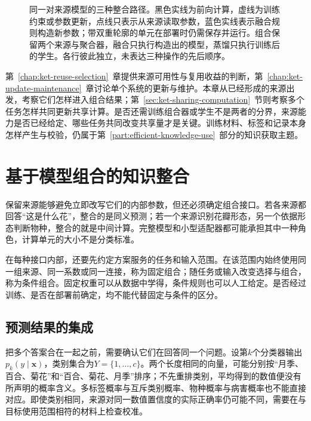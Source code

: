 \begin{figure}[htbp]
  \centering
  
  \caption{同一对来源模型的三种整合路径。黑色实线为前向计算，虚线为训练约束或参数更新，点线只表示从来源读取参数，蓝色实线表示融合规则构造新参数；带双重轮廓的单元在部署时仍需保存并运行。组合保留两个来源与聚合器，融合只执行构造出的模型，蒸馏只执行训练后的学生。各行彼此独立，未表达三种操作的先后顺序。}
  \label{fig:ket-integration-routes}
\end{figure}

第~\ref{chap:ket-reuse-selection}~章提供来源可用性与复用收益的判断，第~\ref{chap:ket-update-maintenance}~章讨论单个系统的更新与维护。本章从已经形成的来源出发，考察它们怎样进入组合结果；第~\ref{sec:ket-sharing-computation}~节则考察多个任务怎样共同更新共享计算。是否还需训练组合器或学生不是两者的分界，来源能力是否已经给定、哪些任务共同改变共享量才是关键。训练材料、标签和记录本身怎样产生与校验，仍属于第~\ref{part:efficient-knowledge-use}~部分的知识获取主题。

\section{基于模型组合的知识整合}
\label{sec:ket-integration-composition}

保留来源能够避免立即改写它们的内部参数，但还必须确定组合接口。若各来源都回答“这是什么花”，整合的是同义预测；若一个来源识别花瓣形态，另一个依据形态判断物种，整合的就是中间计算。完整模型和小型适配器都可能承担其中一种角色，计算单元的大小不是分类标准。

在每种接口内部，还要先约定方案服务的任务和输入范围。在该范围内始终使用同一组来源、同一系数或同一连接，称为固定组合；随任务或输入改变选择与组合，称为条件组合。固定权重可以从数据中学得，条件规则也可以人工给定。是否经过训练、是否在部署前确定，均不能代替固定与条件的区分。

\subsection{预测结果的集成}
\label{sec:ket-integration-prediction}

把多个答案合在一起之前，需要确认它们在回答同一个问题。设第$k$个分类器输出$p_k(y\mid\bm{x})$，类别集合为$Y=\{1,\ldots,c\}$。两个长度相同的向量，可能分别按“月季、百合、菊花”和“百合、菊花、月季”排序；不先重排类别，平均得到的数值便没有所声明的概率含义。多标签概率与互斥类别概率、物种概率与病害概率也不能直接对应。即使类别相同，来源对同一数值置信度的实际正确率仍可能不同，需要在与目标使用范围相符的材料上检查校准。

